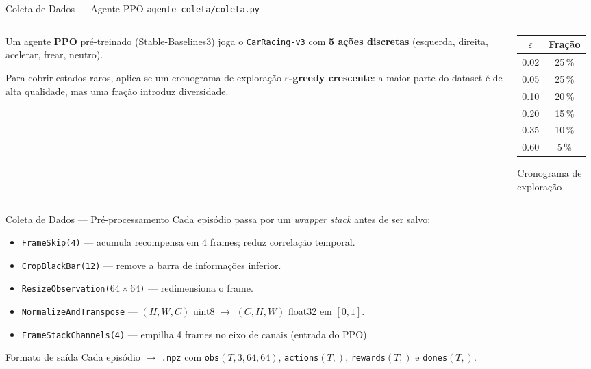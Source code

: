 \documentclass[11pt,aspectratio=169]{beamer}
\begin{document}
\begin{frame}{Coleta de Dados --- Agente PPO}
  \small\texttt{agente\_coleta/coleta.py}
  \medskip

  \begin{columns}[T]
    \begin{column}{0.55\textwidth}
      Um agente \textbf{PPO} pré-treinado (Stable-Baselines3) joga o
      \texttt{CarRacing-v3} com \textbf{5 ações discretas}
      (esquerda, direita, acelerar, frear, neutro).

      \medskip
      Para cobrir estados raros, aplica-se um cronograma de exploração
      \textbf{$\varepsilon$-greedy crescente}: a maior parte do dataset é de
      alta qualidade, mas uma fração introduz diversidade.
    \end{column}
    \begin{column}{0.42\textwidth}
      \centering
      \begin{table}
        \footnotesize
        \begin{tabular}{cc}
          \toprule
          $\varepsilon$ & Fração \\
          \midrule
          0.02 & 25\,\% \\
          0.05 & 25\,\% \\
          0.10 & 20\,\% \\
          0.20 & 15\,\% \\
          0.35 & 10\,\% \\
          0.60 &  5\,\% \\
          \bottomrule
        \end{tabular}
      \end{table}
      {\footnotesize Cronograma de exploração}
    \end{column}
  \end{columns}
\end{frame}

\begin{frame}{Coleta de Dados --- Pré-processamento}
  Cada episódio passa por um \emph{wrapper stack} antes de ser salvo:
  \medskip
  \begin{itemize}
    \item \texttt{FrameSkip(4)} --- acumula recompensa em 4 frames; reduz
          correlação temporal.
    \item \texttt{CropBlackBar(12)} --- remove a barra de informações inferior.
    \item \texttt{ResizeObservation($64{\times}64$)} --- redimensiona o frame.
    \item \texttt{NormalizeAndTranspose} --- $(H,W,C)$ uint8 $\to$ $(C,H,W)$
          float32 em $[0,1]$.
    \item \texttt{FrameStackChannels(4)} --- empilha 4 frames no eixo de canais
          (entrada do PPO).
  \end{itemize}

  \bigskip
  \begin{block}{Formato de saída}
    Cada episódio $\to$ \texttt{.npz} com
    \texttt{obs}$(T,3,64,64)$, \texttt{actions}$(T,)$,
    \texttt{rewards}$(T,)$ e \texttt{dones}$(T,)$.
  \end{block}
\end{frame}
\end{document}
